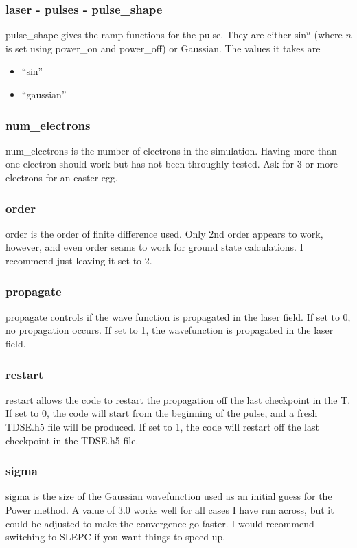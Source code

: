 \documentclass{article}
\begin{document}
\subsubsection{laser - pulses - pulse\_shape}
pulse\_shape gives the ramp functions for the pulse. They are either sin$^n$ (where $n$ is set using power\_on and power\_off) or Gaussian. The values it takes are
\begin{itemize}
  \item ``sin''
  \item ``gaussian''
\end{itemize}

\subsubsection{num\_electrons}
num\_electrons is the number of electrons in the simulation. Having more than one electron should work but has not been throughly tested. Ask for 3 or more electrons for an easter egg.

\subsubsection{order}
order is the order of finite difference used. Only 2nd order appears to work, however, and even order seams to work for ground state calculations. I recommend just leaving it set to 2.

\subsubsection{propagate}
\label{ssub:propagate}
propagate controls if the wave function is propagated in the laser field. If set to 0, no propagation occurs. If set to 1, the wavefunction is propagated in the laser field.

\subsubsection{restart}
\label{ssub:restart}
restart allows the code to restart the propagation off the last checkpoint in the T. If set to 0, the code will start from the beginning of the pulse, and a fresh TDSE.h5 file will be produced. If set to 1, the code will restart off the last checkpoint in the TDSE.h5 file.

\subsubsection{sigma}
sigma is the size of the Gaussian wavefunction used as an initial guess for the Power method. A value of 3.0 works well for all cases I have run across, but it could be adjusted to make the convergence go faster. I would recommend switching to SLEPC if you want things to speed up.
\end{document}
